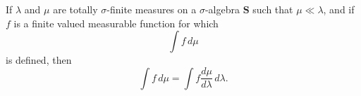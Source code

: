 If $\lambda$ and $\mu$ are totally $\sigma$-finite measures on a $\sigma$-algebra $\mathbf{S}$ such that $\mu \ll \lambda$, and if $f$ is a finite valued measurable function for which
$$\int f \, d\mu$$
is defined, then
$$\int f \, d\mu = \int f \frac{d\mu}{d\lambda} \, d\lambda.$$
